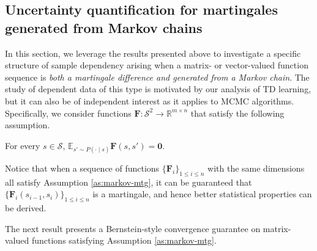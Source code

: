 \subsection{Uncertainty quantification for martingales generated from Markov chains}\label{sec:MC-mtg}
In this section, we leverage the results presented above to investigate a specific structure of sample dependency arising when a matrix- or vector-valued function sequence is \emph{both a martingale difference and generated from a Markov chain}. The study of dependent data of this type is  motivated by our analysis of TD learning, but it can also be of independent interest as it applies to MCMC algorithms. Specifically, we consider functions $\bm{F}:\mathcal{S}^2 \to \mathbb{R}^{m \times n}$ that satisfy the following assumption. %
\medskip
\begin{customassumption}\label{as:markov-mtg}
For every $s \in \mathcal{S}$, $\mathbb{E}_{s' \sim P(\cdot \mid s)}\bm{F}(s,s') = \bm{0}$.
\end{customassumption}
\medskip

Notice that when a sequence of functions $\{\bm{F}_i\}_{1 \leq i \leq n}$ with the same dimensions all satisfy Assumption \ref{as:markov-mtg}, it can be guaranteed that $\{\bm{F}_i(s_{i-1},s_i)\}_{1 \leq i \leq n}$ is a martingale, and hence better statistical properties can be derived. 

The next result presents a Bernstein-style convergence guarantee on matrix-valued functions satisfying Assumption \ref{as:markov-mtg}.

